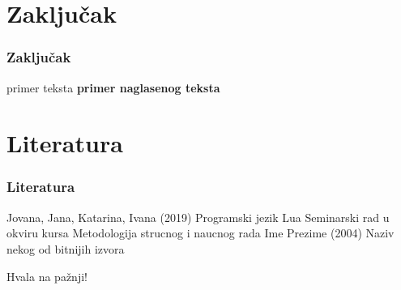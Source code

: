 \documentclass{beamer}
\begin{document}


\section{Zaključak}

\begin{frame}
\frametitle{Zaključak}

\begin{block}{primer teksta}
\textbf{primer naglasenog teksta}
\end{block}

\end{frame}


\section{Literatura}

\begin{frame}
\frametitle{Literatura}

\footnotesize{
\begin{thebibliography}{99}
 Jovana, Jana, Katarina, Ivana (2019)
\newblock Programski jezik Lua \small{Seminarski rad u okviru kursa Metodologija strucnog i naucnog rada}
 Ime Prezime (2004)
\newblock Naziv nekog od bitnijih izvora
\end{thebibliography}
}
\end{frame}


\begin{frame}
\Huge{\centerline{Hvala na pažnji!}}
\end{frame}

\end{document}
